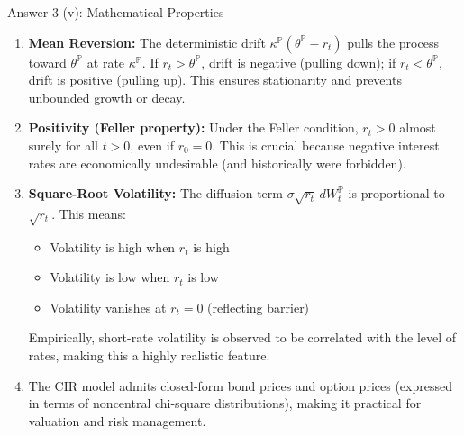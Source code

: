 \documentclass[compress]{beamer}
\begin{document}
\begin{frame}[allowframebreaks]{Answer 3 (v): Mathematical Properties}
    \small
    
    \begin{enumerate}
        \item \textbf{Mean Reversion:} The deterministic drift $\kappa^{\mathbb{P}}(\theta^{\mathbb{P}} - r_t)$ pulls the process toward $\theta^{\mathbb{P}}$ at rate $\kappa^{\mathbb{P}}$. If $r_t > \theta^{\mathbb{P}}$, drift is negative (pulling down); if $r_t < \theta^{\mathbb{P}}$, drift is positive (pulling up). This ensures stationarity and prevents unbounded growth or decay.
        
        \vspace{1em}

        \item \textbf{Positivity (Feller property):} Under the Feller condition, $r_t > 0$ almost surely for all $t > 0$, even if $r_0 = 0$. This is crucial because negative interest rates are economically undesirable (and historically were forbidden).
        
		\vspace{1em}

        \item \textbf{Square-Root Volatility:} The diffusion term $\sigma\sqrt{r_t}\,dW_t^{\mathbb{P}}$ is proportional to $\sqrt{r_t}$. This means:
        \begin{itemize}
            \item Volatility is high when $r_t$ is high
            \item Volatility is low when $r_t$ is low
            \item Volatility vanishes at $r_t = 0$ (reflecting barrier)
        \end{itemize}
        
        Empirically, short-rate volatility is observed to be correlated with the level of rates, making this a highly realistic feature.
        
        \vspace{1em}
		
        \item The CIR model admits closed-form bond prices and option prices (expressed in terms of noncentral chi-square distributions), making it practical for valuation and risk management.
        
	\end{enumerate}
\end{frame}
\end{document}
